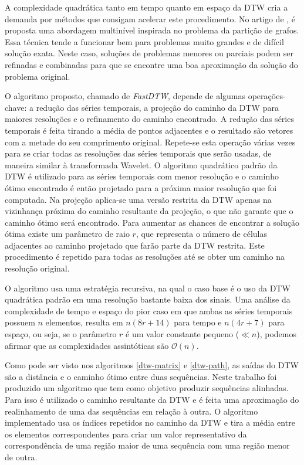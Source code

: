 A complexidade quadrática tanto em tempo quanto em espaço da DTW cria a demanda por métodos que consigam acelerar este procedimento. No artigo de \citet{salvador2007toward}, é proposta uma abordagem multinível inspirada no problema da partição de grafos. Essa técnica tende a funcionar bem para problemas muito grandes e de difícil solução exata. Neste caso, soluções de problemas menores ou parciais podem ser refinadas e combinadas para que se encontre uma boa aproximação da solução do problema original.

O algoritmo proposto, chamado de \textit{FastDTW}, depende de algumas operações-chave: a redução das séries temporais, a projeção do caminho da DTW para maiores resoluções e o refinamento do caminho encontrado. A redução das séries temporais é feita tirando a média de pontos adjacentes e o resultado são vetores com a metade do seu comprimento original. Repete-se esta operação várias vezes para se criar todas as resoluções das séries temporais que serão usadas, de maneira similar à transformada Wavelet. O algoritmo quadrático padrão da DTW é utilizado para as séries temporais com menor resolução e o caminho ótimo encontrado é então projetado para a próxima maior resolução que foi computada. Na projeção aplica-se uma versão restrita da DTW apenas na vizinhança próxima do caminho resultante da projeção, o que não garante que o caminho ótimo será encontrado. Para aumentar as chances de encontrar a solução ótima existe um parâmetro de raio $r$, que representa o número de células adjacentes ao caminho projetado que farão parte da DTW restrita. Este procedimento é repetido para todas as resoluções até se obter um caminho na resolução original.

O algoritmo usa uma estratégia recursiva, na qual o caso base é o uso da DTW quadrática padrão em uma resolução bastante baixa dos sinais. Uma análise da complexidade de tempo e espaço do pior caso em que ambas as séries temporais possuem $n$ elementos, resulta em $n(8r + 14)$ para tempo e $n(4r + 7)$ para espaço, ou seja, se o parâmetro $r$ é um valor constante pequeno ($\ll n$), podemos afirmar que as complexidades assintóticas são $\mathcal{O}(n)$.

Como pode ser visto nos algoritmos \ref{dtw-matrix} e \ref{dtw-path}, as saídas do DTW são a distância e o caminho ótimo entre duas sequências. Neste trabalho foi produzido um algoritmo que tem como objetivo produzir sequências alinhadas. Para isso é utilizado o caminho resultante da DTW e é feita uma aproximação do realinhamento de uma das sequências em relação à outra. O algoritmo implementado usa os índices repetidos no caminho da DTW e tira a média entre os elementos correspondentes para criar um valor representativo da correspondência de uma região maior de uma sequência com uma região menor de outra.

